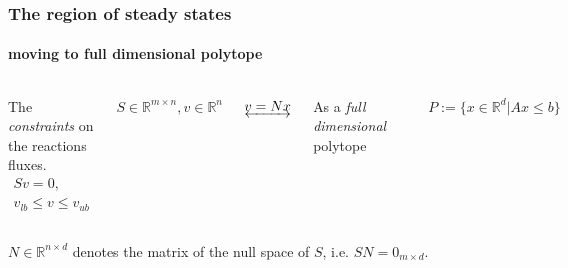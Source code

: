\documentclass{beamer}
\begin{document}
   \begin{frame}
      \frametitle{The region of steady states}
      \framesubtitle{moving to full dimensional polytope}

      \begin{columns}[onlytextwidth]

         \centering

            \small
            The \textit{constraints} on the reactions fluxes.
             \begin{equation}
               \begin{split}
                Sv=0, \\ 
                v_{lb} \leq v \leq v_{ub}
               \end{split}
            \label{eq:fba}
            \end{equation}
 

            \bigskip
            $S \in \mathbb{R}^{m \times n}, v \in \mathbb{R}^{n}$


         \centering
            $\underleftrightarrow{v = Nx}$

         \centering

            As a \textit{full dimensional} polytope

            \includegraphics[width=30mm]{../met_nets/resources/3dpoly.svg.png}

            $P := \{x \in \mathbb{R}^d | Ax \leq b\}$

      \end{columns}

      \bigskip

      \footnotesize
      $N\in\mathbb{R}^{n\times d}$ denotes the matrix of the null space of $S$,
      i.e. $S N = 0_{m \times d}$. \bigskip


\end{frame}
\end{document}
